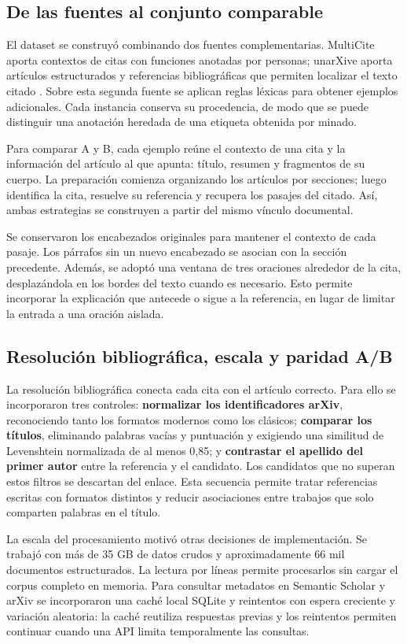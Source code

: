 \documentclass[10pt,a4paper,twocolumn]{article}
\begin{document}
\subsection{De las fuentes al conjunto comparable}
El dataset se construyó combinando dos fuentes complementarias. MultiCite aporta contextos de citas con funciones anotadas por personas; unarXive aporta artículos estructurados y referencias bibliográficas que permiten localizar el texto citado \cite{multicite,unarxive}. Sobre esta segunda fuente se aplican reglas léxicas para obtener ejemplos adicionales. Cada instancia conserva su procedencia, de modo que se puede distinguir una anotación heredada de una etiqueta obtenida por minado.

Para comparar A y B, cada ejemplo reúne el contexto de una cita y la información del artículo al que apunta: título, resumen y fragmentos de su cuerpo. La preparación comienza organizando los artículos por secciones; luego identifica la cita, resuelve su referencia y recupera los pasajes del citado. Así, ambas estrategias se construyen a partir del mismo vínculo documental.

Se conservaron los encabezados originales para mantener el contexto de cada pasaje. Los párrafos sin un nuevo encabezado se asocian con la sección precedente. Además, se adoptó una ventana de tres oraciones alrededor de la cita, desplazándola en los bordes del texto cuando es necesario. Esto permite incorporar la explicación que antecede o sigue a la referencia, en lugar de limitar la entrada a una oración aislada.

\subsection{Resolución bibliográfica, escala y paridad A/B}
La resolución bibliográfica conecta cada cita con el artículo correcto. Para ello se incorporaron tres controles: \textbf{normalizar los identificadores arXiv}, reconociendo tanto los formatos modernos como los clásicos; \textbf{comparar los títulos}, eliminando palabras vacías y puntuación y exigiendo una similitud de Levenshtein normalizada de al menos 0,85; y \textbf{contrastar el apellido del primer autor} entre la referencia y el candidato. Los candidatos que no superan estos filtros se descartan del enlace. Esta secuencia permite tratar referencias escritas con formatos distintos y reducir asociaciones entre trabajos que solo comparten palabras en el título.

La escala del procesamiento motivó otras decisiones de implementación. Se trabajó con más de 35 GB de datos crudos y aproximadamente 66 mil documentos estructurados. La lectura por líneas permite procesarlos sin cargar el corpus completo en memoria. Para consultar metadatos en Semantic Scholar y arXiv se incorporaron una caché local SQLite y reintentos con espera creciente y variación aleatoria: la caché reutiliza respuestas previas y los reintentos permiten continuar cuando una API limita temporalmente las consultas.
\end{document}

